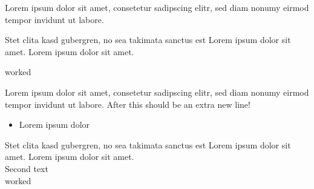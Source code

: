 \documentclass[11pt]{article}
\begin{document}
Lorem ipsum dolor sit amet, consetetur sadipscing elitr, sed diam nonumy eirmod tempor invidunt ut labore.

Stet clita kasd gubergren, no sea takimata sanctus est Lorem ipsum dolor sit amet. Lorem ipsum dolor sit amet.

worked

Lorem ipsum dolor sit amet, consetetur sadipscing elitr, sed diam nonumy eirmod tempor invidunt ut labore. After this should be an extra new line!

\begin{itemize}

\item Lorem ipsum dolor

\end{itemize}

Stet clita kasd gubergren, no sea takimata sanctus est Lorem ipsum dolor sit amet. Lorem ipsum dolor sit amet.\\

Second text\\

worked\\
\end{document}
